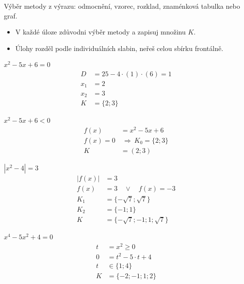 \documentclass[11pt,a4paper]{article}
\begin{document}
Výběr metody z výrazu: odmocnění, vzorec, rozklad, znaménková tabulka nebo graf.
\begin{itemize}
\item V každé úloze zdůvodni výběr metody a zapisuj množinu $K$.
\item Úlohy rozděl podle individuálních slabin, neřeš celou sbírku frontálně.
\end{itemize}
\begin{prikladReseniBox}[title={Příklad 1}]
$x^{2} - 5x + 6=0$
\tcblower
\[
\begin{aligned}
D&=25-4\cdot(1)\cdot(6)=1\\[2pt]
x_1&=2\\[2pt]
x_2&=3\\[2pt]
K&=\{2;3\}
\end{aligned}
\]
\end{prikladReseniBox}
\begin{prikladReseniBox}[title={Příklad 2}]
$x^{2} - 5x + 6<0$
\tcblower
\[
\begin{aligned}
f(x)&=x^{2} - 5x + 6\\[2pt]
f(x)=0&\ \Rightarrow\ K_0=\{2;3\}\\[2pt]
K&=(2;3)
\end{aligned}
\]
\end{prikladReseniBox}
\begin{prikladReseniBox}[title={Příklad 3}]
$\left|x^{2} - 4\right|=3$
\tcblower
\[
\begin{aligned}
|f(x)|&=3\\[2pt]
f(x)&=3\quad\vee\quad f(x)=-3\\[2pt]
K_1&=\{- \sqrt{7};\sqrt{7}\}\\[2pt]
K_2&=\{-1;1\}\\[2pt]
K&=\{- \sqrt{7};-1;1;\sqrt{7}\}
\end{aligned}
\]
\end{prikladReseniBox}
\begin{zadaniReseniBox}[title={Samostatná práce 1}]
$x^{4} - 5x^{2} + 4=0$
\tcblower
\[
\begin{aligned}
t&=x^2\ge0\\[2pt]
0&=t^{2} - 5 \cdot t + 4\\[2pt]
t&\in\{1;4\}\\[2pt]
K&=\{-2;-1;1;2\}
\end{aligned}
\]
\end{zadaniReseniBox}
\end{document}
